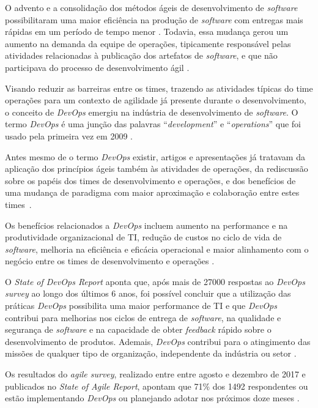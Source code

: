 O advento e a consolidação dos métodos ágeis de desenvolvimento de
\textit{software} possibilitaram uma maior eficiência na produção de
\textit{software} com entregas mais rápidas em um período de tempo menor
\cite{agile_sw_dev}. Todavia, essa mudança gerou um aumento na demanda da equipe de
operações, tipicamente responsável pelas atividades relacionadas à
publicação dos artefatos de \textit{software}, e que não participava
do processo de desenvolvimento ágil \cite{humble2010continuous}.

Visando reduzir as barreiras entre os times, trazendo as atividades típicas
do time operações para um contexto de agilidade já presente durante o
desenvolvimento, o conceito de \textit{DevOps} emergiu na indústria de
desenvolvimento de \textit{software}. O termo \textit{DevOps} é uma
junção das palavras ``\textit{development}'' e ``\textit{operations}'' que
foi usado pela primeira vez em 2009 \cite{devops_for_developers}.

Antes mesmo de o termo \textit{DevOps} existir, artigos e apresentações
já tratavam da aplicação dos princípios ágeis também às atividades de operações,
da rediscussão sobre os papéis dos times de desenvolvimento e operações, e dos
benefícios de uma mudança de paradigma com maior aproximação e colaboração
entre estes times~\cite{devops_for_developers,agile_infra_operations,flickr}.

Os benefícios relacionados a \textit{DevOps} incluem aumento na performance
e na produtividade organizacional de \acrshort{TI}, redução de custos no ciclo de vida
de \textit{software}, melhoria na eficiência e eficácia operacional e maior
alinhamento com o negócio entre os times de desenvolvimento e operações
\cite{characterizing_devops}.

O \textit{State of DevOps Report} aponta que, após mais de 27000
respostas ao \textit{DevOps survey} ao longo dos últimos 6 anos, foi possível
concluir que a utilização das práticas \textit{DevOps} possibilita uma maior
performance de \acrshort{TI} e que \textit{DevOps} contribui para melhorias nos
ciclos de entrega de \textit{software}, na qualidade e segurança de \textit{software}
e na capacidade de obter \textit{feedback} rápido sobre o desenvolvimento de produtos.
Ademais, \textit{DevOps} contribui para o atingimento das missões de qualquer
tipo de organização, independente da indústria ou setor \cite{state_of_devops}.

Os resultados do \textit{agile survey}, realizado entre entre agosto e dezembro
de 2017 e publicados no \textit{State of Agile Report}, apontam que 71\% dos 1492
respondentes ou estão implementando \textit{DevOps} ou planejando adotar nos
próximos doze meses \cite{state_of_agile}.


